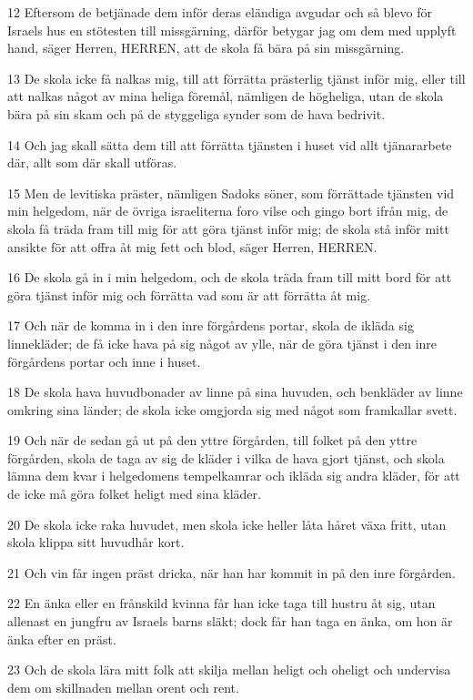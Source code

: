 \par 12 Eftersom de betjänade dem inför deras eländiga avgudar och så blevo för Israels hus en stötesten till missgärning, därför betygar jag om dem med upplyft hand, säger Herren, HERREN, att de skola få bära på sin missgärning.
\par 13 De skola icke få nalkas mig, till att förrätta prästerlig tjänst inför mig, eller till att nalkas något av mina heliga föremål, nämligen de högheliga, utan de skola bära på sin skam och på de styggeliga synder som de hava bedrivit.
\par 14 Och jag skall sätta dem till att förrätta tjänsten i huset vid allt tjänararbete där, allt som där skall utföras.
\par 15 Men de levitiska präster, nämligen Sadoks söner, som förrättade tjänsten vid min helgedom, när de övriga israeliterna foro vilse och gingo bort ifrån mig, de skola få träda fram till mig för att göra tjänst inför mig; de skola stå inför mitt ansikte för att offra åt mig fett och blod, säger Herren, HERREN.
\par 16 De skola gå in i min helgedom, och de skola träda fram till mitt bord för att göra tjänst inför mig och förrätta vad som är att förrätta åt mig.
\par 17 Och när de komma in i den inre förgårdens portar, skola de ikläda sig linnekläder; de få icke hava på sig något av ylle, när de göra tjänst i den inre förgårdens portar och inne i huset.
\par 18 De skola hava huvudbonader av linne på sina huvuden, och benkläder av linne omkring sina länder; de skola icke omgjorda sig med något som framkallar svett.
\par 19 Och när de sedan gå ut på den yttre förgården, till folket på den yttre förgården, skola de taga av sig de kläder i vilka de hava gjort tjänst, och skola lämna dem kvar i helgedomens tempelkamrar och ikläda sig andra kläder, för att de icke må göra folket heligt med sina kläder.
\par 20 De skola icke raka huvudet, men skola icke heller låta håret växa fritt, utan skola klippa sitt huvudhår kort.
\par 21 Och vin får ingen präst dricka, när han har kommit in på den inre förgården.
\par 22 En änka eller en frånskild kvinna får han icke taga till hustru åt sig, utan allenast en jungfru av Israels barns släkt; dock får han taga en änka, om hon är änka efter en präst.
\par 23 Och de skola lära mitt folk att skilja mellan heligt och oheligt och undervisa dem om skillnaden mellan orent och rent.
